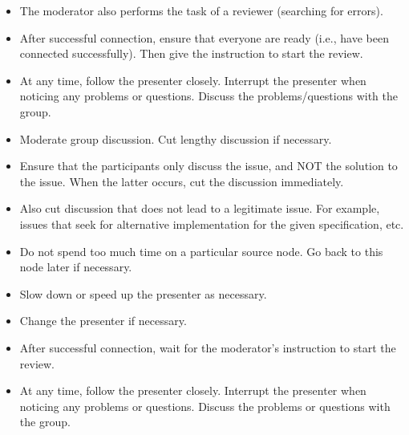 \begin{itemize}
\item The moderator also performs the task of a reviewer (searching for errors).
\item After successful connection, ensure that everyone are ready
  (i.e., have been connected successfully). Then give the instruction to
  start the review.
\item At any time, follow the presenter closely. Interrupt the
  presenter when noticing any problems or questions. Discuss the
  problems/questions with the group.
\item Moderate group discussion. Cut lengthy discussion if necessary.
\item Ensure that the participants only discuss the issue, and NOT the
  solution to the issue. When the latter occurs, cut the discussion
  immediately.
\item Also cut discussion that does not lead to a legitimate issue. For
  example, issues that seek for alternative implementation for the given
  specification, etc.
\item Do not spend too much time on a particular source node. Go back
to this node later if necessary.
\item Slow down or speed up the presenter as necessary.
\item Change the presenter if necessary.
\end{itemize}

\begin{itemize}
\item After successful connection, wait for the moderator's
instruction to start the review.
\item At any time, follow the presenter closely. Interrupt the presenter when
noticing any problems or questions. Discuss the
problems or questions with the group.
\end{itemize}


